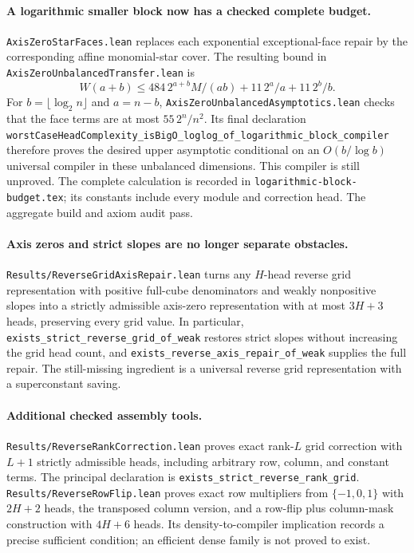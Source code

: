 \documentclass[11pt]{article}
\begin{document}
\paragraph{A logarithmic smaller block now has a checked complete budget.}
\texttt{AxisZeroStarFaces.lean} replaces each exponential exceptional-face
repair by the corresponding affine monomial-star cover. The resulting
bound in \texttt{AxisZeroUnbalancedTransfer.lean} is
\[
 W(a+b)\leq484\,2^{a+b}M/(ab)+11\,2^a/a+11\,2^b/b.
\]
For $b=\lfloor\log_2 n\rfloor$ and $a=n-b$,
\texttt{AxisZeroUnbalancedAsymptotics.lean} checks that the face terms
are at most $55\,2^n/n^2$. Its final declaration
\texttt{worstCaseHeadComplexity\_isBigO\_loglog\_of\_logarithmic\_block\_compiler}
therefore proves the desired upper asymptotic conditional on an
$O(b/\log b)$ universal compiler in these unbalanced dimensions.
This compiler is still unproved. The complete calculation is recorded
in \texttt{logarithmic-block-budget.tex}; its constants include every
module and correction head. The aggregate build and axiom audit pass.

\paragraph{Axis zeros and strict slopes are no longer separate obstacles.}
\texttt{Results/ReverseGridAxisRepair.lean} turns any $H$-head reverse
grid representation with positive full-cube denominators and weakly
nonpositive slopes into a strictly admissible axis-zero representation
with at most $3H+3$ heads, preserving every grid value. In particular,
\texttt{exists\_strict\_reverse\_grid\_of\_weak} restores strict slopes
without increasing the grid head count, and
\texttt{exists\_reverse\_axis\_repair\_of\_weak} supplies the full repair.
The still-missing ingredient is a universal reverse grid representation
with a superconstant saving.

\paragraph{Additional checked assembly tools.}
\texttt{Results/ReverseRankCorrection.lean} proves exact rank-$L$
grid correction with $L+1$ strictly admissible heads, including arbitrary
row, column, and constant terms. The principal declaration is
\texttt{exists\_strict\_reverse\_rank\_grid}.
\texttt{Results/ReverseRowFlip.lean} proves exact row multipliers from
$\{-1,0,1\}$ with $2H+2$ heads, the transposed column version,
and a row-flip plus column-mask construction with $4H+6$ heads.
Its density-to-compiler implication records a precise sufficient
condition; an efficient dense family is not proved to exist.
\end{document}
